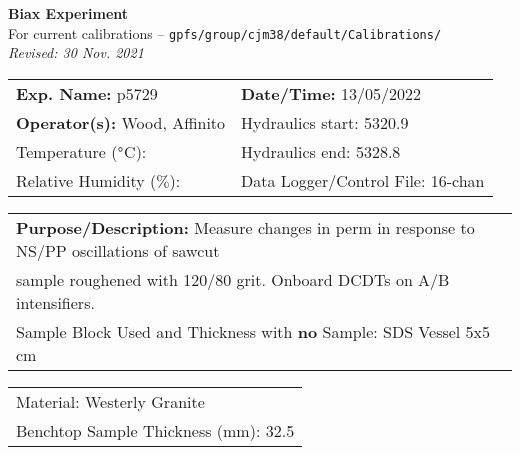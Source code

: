 \documentclass[letterpaper, 10pt]{article}
\begin{document}
\begin{center}
    {\Large \textbf{Biax Experiment}}\\
    {\small For current calibrations -- \texttt{gpfs/group/cjm38/default/Calibrations/}}\\
    {\footnotesize \textit{Revised: 30 Nov. 2021}}
\end{center}



\begin{table}[!ht]
	\renewcommand{\arraystretch}{1.1}
	\begin{tabular}{p{10cm} p{10cm} }
	    \textbf{Exp. Name: }p5729 & \textbf{Date/Time: }13/05/2022\\
	    \textbf{Operator(s): }Wood, Affinito & Hydraulics start: 5320.9 \\
	    Temperature ($\degree$C):  & Hydraulics end: 5328.8 \\
	    Relative Humidity ($\%$):  & Data Logger/Control File: 16-chan \\
	\end{tabular}
\end{table} 
\vspace{-0.5cm} 

\begin{table}[!ht]
	\renewcommand{\arraystretch}{1.1}
	\begin{tabular}{p{20cm}}\textbf{Purpose/Description:} Measure changes in perm in response to NS/PP oscillations of sawcut\\ sample roughened with 120/80 grit. Onboard DCDTs on A/B intensifiers. \\Sample Block Used and Thickness with \textbf{no} Sample: SDS Vessel 5x5 cm \\
	\end{tabular}
    \end{table} \vspace{-0.5cm} 

\begin{table}[!ht]
        \small
        \renewcommand{\arraystretch}{1.2}
        \begin{tabular}{ |p{7cm}| } \hline 
Material: Westerly Granite \\Benchtop Sample Thickness (mm): 32.5 \\ \hline \end{tabular} \end{table} \vspace{-0.5cm} 
\end{document}
